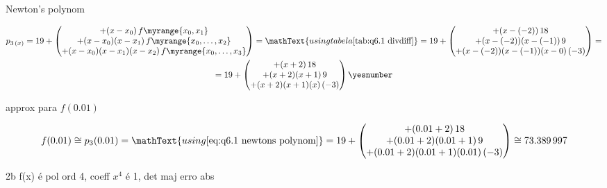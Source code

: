 \documentclass["CN_A-Tests_Resolutions.tex"]{subfiles}
\begin{document}
\begin{questionBox}
\begin{questionBox}
    Newton's polynom
    \begin{tcolorbox}
      \begin{gather}
        p_{3\,(x)}
        = 19
        + \begin{pmatrix}
          + (x-x_0)\,f\myrange{x_0,x_{1}}
          \\
          + (x-x_0)(x-x_1)\,f\myrange{x_0,\dots,x_{2}}
          \\
          + (x-x_0)(x-x_1)(x-x_2)\,f\myrange{x_0,\dots,x_{3}}
        \end{pmatrix}
        = \mathText{using tabela \ref{tab:q6.1 divdiff}}
        = 19
        + \begin{pmatrix}
          + (x-(-2))\,18
          \\
          + (x-(-2))(x-(-1))\,9
          \\
          + (x-(-2))(x-(-1))(x-0)\,(-3)
        \end{pmatrix}
        = \\
        = 19
        + \begin{pmatrix}
          + (x+2)\,18
          \\
          + (x+2)(x+1)\,9
          \\
          + (x+2)(x+1)(x)\,(-3)
        \end{pmatrix}
        \yesnumber\label{eq:q6.1 newtons polynom}
      \end{gather}
    \end{tcolorbox}

    approx para \(f(0.01)\)
    \begin{tcolorbox}
      \begin{gather}
        f(0.01)
        \cong 
        p_{3}(0.01)
        = \mathText{using \eqref{eq:q6.1 newtons polynom}}
        = 19
        + \begin{pmatrix}
          + (0.01+2)\,18
          \\
          + (0.01+2)(0.01+1)\,9
          \\
          + (0.01+2)(0.01+1)(0.01)\,(-3)
        \end{pmatrix}
        \cong \num{73.389997}
        \label{eq:q6.1 approx}
      \end{gather}
    \end{tcolorbox}
  \end{questionBox}

  \begin{questionBox}2b{} %
    f(x) é pol ord 4, coeff \(x^4\) é 1, det maj erro abs
    \answer{}


\end{questionBox}
\end{questionBox}
\end{document}

